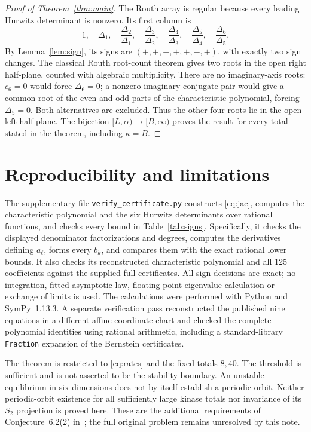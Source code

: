 \documentclass[11pt]{article}
\newcommand{\dd}{\Delta}
\begin{document}
\begin{proof}[Proof of Theorem~\ref{thm:main}]
The Routh array is regular because every leading Hurwitz determinant is
nonzero. Its first column is
\[
 1,\quad \dd_1,\quad\frac{\dd_2}{\dd_1},\quad
 \frac{\dd_3}{\dd_2},\quad\frac{\dd_4}{\dd_3},\quad
 \frac{\dd_5}{\dd_4},\quad\frac{\dd_6}{\dd_5}.
\]
By Lemma~\ref{lem:sign}, its signs are $(+,+,+,+,+,-,+)$, with exactly
two sign changes. The classical Routh root-count theorem gives two roots in
the open right half-plane, counted with algebraic multiplicity.
There are no imaginary-axis roots: $c_6=0$ would force $\dd_6=0$;
a nonzero imaginary conjugate pair would give a common root of the even
and odd parts of the characteristic polynomial, forcing $\dd_5=0$.
Both alternatives are excluded. Thus the other four roots lie in the open
left half-plane. The bijection $[L,\alpha)\to[B,\infty)$ proves the result
for every total stated in the theorem, including $\kappa=B$.
\end{proof}

\section{Reproducibility and limitations}

The supplementary file \texttt{verify\_certificate.py} constructs
\eqref{eq:jac}, computes the characteristic polynomial and the six Hurwitz
determinants over rational functions, and checks every bound in
Table~\ref{tab:signs}. Specifically, it checks the displayed denominator
factorizations and degrees, computes the derivatives defining $a_\ell$,
forms every $b_k$, and compares them with the exact rational lower bounds.
It also checks its reconstructed characteristic polynomial and all 125
coefficients against the supplied full certificates.
All sign decisions are exact; no integration, fitted asymptotic law,
floating-point eigenvalue calculation or exchange of limits is used.
The calculations were performed with Python and SymPy~1.13.3. A separate
verification pass reconstructed the published nine equations in a different
affine coordinate chart and checked the complete polynomial identities using
rational arithmetic, including a standard-library \texttt{Fraction}
expansion of the Bernstein certificates.

The theorem is restricted to \eqref{eq:rates} and the fixed totals $8,40$.
The threshold is sufficient and is not asserted to be the stability boundary.
An unstable equilibrium in six dimensions does not by itself establish a
periodic orbit. Neither periodic-orbit existence for all sufficiently large
kinase totals nor invariance of its $S_2$ projection is proved here. These are
the additional requirements of Conjecture~6.2(2) in~\cite{CMS}; the full
original problem remains unresolved by this note.
\end{document}
